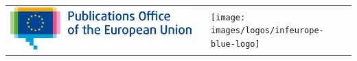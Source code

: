 \begin{titlepage}
\begin{center}

\begin{center}
	\begin{center}
		\setlength{\tabcolsep}{0pt}
        \begin{tabular}{>{\raggedleft}m{3.5cm}>{\centering}m{\dimexpr\textwidth - 8cm\relax}>{\raggedright}m{3.5cm}}
					\includegraphics[width=1.5\linewidth]{images/logos/EU-OP.png}	
					&%
					&%
					\texttt{[image: images/logos/infeurope-blue-logo]} %
		\end{tabular}
    \end{center}


  \vspace{2mm}

\end{center}
  \vspace{5cm}
  \textbf{{\large \DelInitiative\\}}
  \vspace{2cm}
  
  \begin{spacing}{2.5}
    \textbf{\Huge \DelTitle}\\ \vspace{2cm}
  \end{spacing}
  
  
  
  \vspace*{\fill}  
   
  

\end{center}
\end{titlepage}

